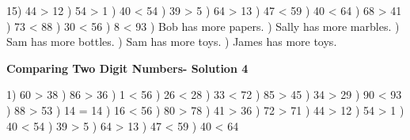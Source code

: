 \documentclass{article}%
\begin{document}
15) 44 > 12%
) 54 > 1%
) 40 < 54%
) 39 > 5%
) 64 > 13%
) 47 < 59%
) 40 < 64%
) 68 > 41%
) 73 < 88%
) 30 < 56%
) 8 < 93%
) Bob has more papers.%
) Sally has more marbles.%
) Sam has more bottles.%
) Sam has more toys.%
) James has more toys.%
\newline%
\newpage%
\large%
\begin{center}%
\textbf{Comparing Two Digit Numbers- Solution 4}%
\newline%
\end{center} \normalsize%
1) 60 > 38%
) 86 > 36%
) 1 < 56%
) 26 < 28%
) 33 < 72%
) 85 > 45%
) 34 > 29%
) 90 < 93%
) 88 > 53%
) 14 = 14%
) 16 < 56%
) 80 > 78%
) 41 > 36%
) 72 > 71%
) 44 > 12%
) 54 > 1%
) 40 < 54%
) 39 > 5%
) 64 > 13%
) 47 < 59%
) 40 < 64%
\newline%
\end{document}
